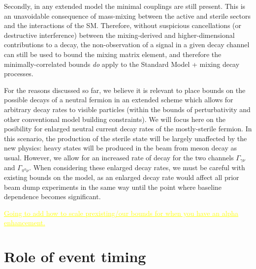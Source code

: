 \documentclass[11pt, a4paper]{article}
\newcommand{\newtext}[2]{\textcolor{#1}{\ul{#2}}}
\begin{document}
Secondly, in any extended model the minimal couplings are still present. This
is an unavoidable consequence of mass-mixing between the active and sterile
sectors and the interactions of the SM. Therefore, without suspicious
cancellations (or destructive interference) between the mixing-derived and
higher-dimensional contributions to a decay, the non-observation of a signal in
a given decay channel can still be used to bound the mixing matrix element, and
therefore the minimally-correlated bounds \emph{do} apply to the Standard Model
+ mixing decay processes. 

For the reasons discussed so far, we believe it is relevant to place bounds on
the possible decays of a neutral fermion in an extended scheme which allows for
arbitrary decay rates to visible particles (within the bounds of perturbativity
and other conventional model building constraints).
%
We will focus here on the posibility for enlarged neutral current decay rates
of the mostly-sterile fermion. In this scenario, the production of the sterile
state will be largely unaffected by the new physics: heavy states will be
produced in the beam from meson decay as usual. However, we allow for an
increased rate of decay for the two channels $\Gamma_{\gamma\nu}$ and
$\Gamma_{\pi^0\nu}$.
%
When considering these enlarged decay rates, we must be careful with existing
bounds on the model, as an enlarged decay rate would affect all prior beam dump
experiments in the same way until the point where baseline dependence becomes
significant.

\newtext{MARK}{Going to add how to scale prexisting/our bounds for when you have an alpha enhancement.}

\section{\label{sec:timing}Role of event timing}
\end{document}
